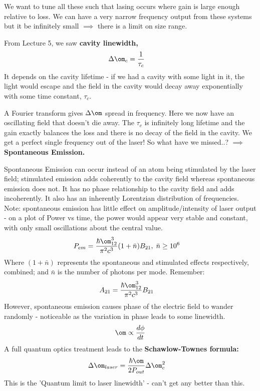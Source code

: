 \documentclass[a4paper, 11pt, normalem]{report}
\begin{document}
We want to tune all these such that lasing occurs where gain is large enough relative to loss. 
We can have a very narrow frequency output from these systems but it  be infinitely small $\implies$ there is a limit on size range. 

From Lecture 5, we saw \textbf{cavity linewidth,}
\begin{align}
    \Delta\om_c &= \frac{1}{\tau_c}
\end{align}
It depends on the cavity lifetime - if we had a cavity with some light in it, the light would escape and the field in the cavity would decay away exponentially with some time constant, $\tau_c$.
\begin{figure}[H]
    \centering
\end{figure}
A Fourier transform gives $\Delta\om$ spread in frequency. 
Here we now have an oscillating field that doesn't die away. 
The $\tau_c$ is infinitely long lifetime and the gain exactly balances the loss and there is no decay of the field in the cavity. 
We get a perfect single frequency out of the laser!
So what have we missed..? $\implies$ \textbf{Spontaneous Emission.}

Spontaneous Emission can occur instead of an atom being stimulated by the laser field; stimulated emission adds coherently to the cavity field whereas spontaneous emission does not. 
It has no phase relationship to the cavity field and adds incoherently. 
It also has an inherently Lorentzian distribution of frequencies. 
Note: spontaneous emission has little effect on amplitude/intensity of laser output - on a plot of Power vs time, the power would appear very stable and constant, with only small oscillations about the central value. 
\begin{align}
    P_{em} &= \frac{\hbar\om_{12}^3}{\pi^2c^3}(1+\bar{n})B_{21},\; \bar{n} \geq 10^6
\end{align}
Where $(1+\bar{n})$ represents the spontaneous and stimulated effects respectively, combined; and $\bar{n}$ is the number of photons per mode. 
Remember:
\begin{align}
    A_{21} &= \frac{\hbar\om_{12}^3}{\pi^2c^3}B_{21}
\end{align}
However, spontaneous emission causes phase of the electric field to wander randomly - noticeable as the variation in phase leads to some linewidth.
\begin{align}
    \om\propto\frac{d\phi}{dt}
\end{align}
A full quantum optics treatment leads to the \textbf{Schawlow-Townes formula:}
\begin{align}
    \Delta\om_{laser} &= \frac{\hbar\om}{2P_{out}}\Delta\om_c^2
\end{align}
This is the 'Quantum limit to laser linewidth' - can't get any better than this. 
\end{document}
